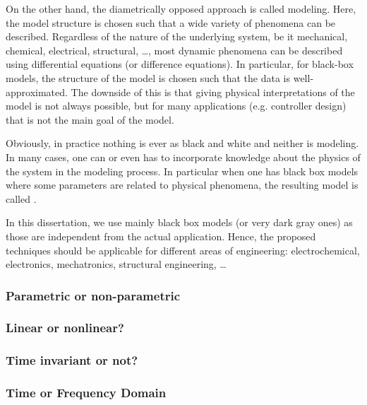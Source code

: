 On the other hand, the diametrically opposed approach is called  modeling.
Here, the model structure is chosen such that a wide variety of phenomena can be described.
Regardless of the nature of the underlying system, be it mechanical, chemical, electrical, structural, \ldots, most dynamic phenomena can be described using differential equations (or difference equations).
In particular, for black-box models, the structure of the model is chosen such that the data is well-approximated.
The downside of this is that giving physical interpretations of the model is not always possible, but for many applications (e.g. controller design) that is not the main goal of the model.

Obviously, in practice nothing is ever as black and white and neither is modeling.
In many cases, one can or even has to incorporate knowledge about the physics of the system in the modeling process.
In particular when one has black box models where some parameters are related to physical phenomena, the resulting model is called .

In this dissertation, we use mainly black box models (or very dark gray ones) as those are independent from the actual application.
Hence, the proposed techniques should be applicable for different areas of engineering: electrochemical, electronics, mechatronics, structural engineering, \ldots

\subsubsection{Parametric or non-parametric}


\subsubsection{Linear or nonlinear?}
\subsubsection{Time invariant or not?}


\subsubsection{Time or Frequency Domain}


